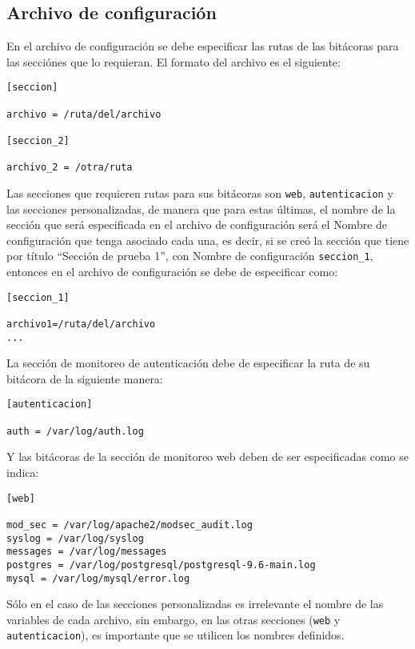 \documentclass[12pt]{article}
\begin{document}
\subsection{Archivo de configuración}

En el archivo de configuración se debe especificar las rutas de las bitácoras para las secciónes que lo requieran. El formato del archivo es el siguiente:
\begin{verbatim}
[seccion]

archivo = /ruta/del/archivo

[seccion_2]

archivo_2 = /otra/ruta
\end{verbatim}

Las secciones que requieren rutas para sus bitácoras son \texttt{web}, \texttt{autenticacion} y las secciones personalizadas, de manera que para estas últimas, el nombre de la sección que será especificada en el archivo de configuración será el \textsf{Nombre de configuración} que tenga asociado cada una, es decir, si se creó la sección que tiene por \textsf{título} ``Sección de prueba 1'', con \textsf{Nombre de configuración} \texttt{seccion\_1}, entonces en el archivo de configuración se debe de especificar como:
\begin{verbatim}
[seccion_1]

archivo1=/ruta/del/archivo
...
\end{verbatim}

La sección de monitoreo de autenticación debe de especificar la ruta de su bitácora de la siguiente manera:
\begin{verbatim}
[autenticacion]

auth = /var/log/auth.log
\end{verbatim}

Y las bitácoras de la sección de monitoreo web deben de ser especificadas como se indica:
\begin{verbatim}
[web]

mod_sec = /var/log/apache2/modsec_audit.log
syslog = /var/log/syslog
messages = /var/log/messages
postgres = /var/log/postgresql/postgresql-9.6-main.log
mysql = /var/log/mysql/error.log
\end{verbatim}

Sólo en el caso de las secciones personalizadas es irrelevante el nombre de las variables de cada archivo, sin embargo, en las otras secciones (\texttt{web} y \texttt{autenticacion}), es importante que se utilicen los nombres definidos. \\
\end{document}
